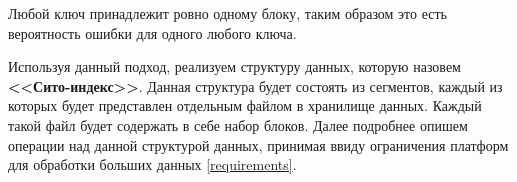 Любой ключ принадлежит ровно одному блоку, таким образом это есть вероятность ошибки для одного любого ключа.

Используя данный подход, реализуем структуру данных, которую назовем \textbf{<<Сито-индекс>>}. Данная структура будет состоять из сегментов, каждый из которых будет представлен отдельным файлом в хранилище данных. Каждый такой файл будет содержать в себе набор блоков. Далее подробнее опишем операции над данной структурой данных, принимая ввиду ограничения платформ для обработки больших данных \ref{requirements}.

